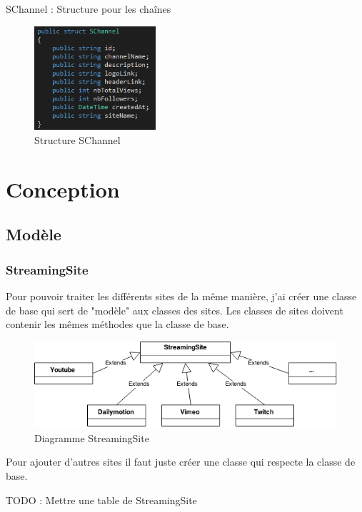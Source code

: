 \documentclass[11pt]{report} %
\begin{document}
			SChannel : Structure pour les chaînes
			
			\begin{figure}[h]
				\center
				\includegraphics[width=0.4\textwidth]{../img/SChannel.png}
				\caption{Structure SChannel}
				\label{SChanel}
			\end{figure}
			
	\newpage
	\section{Conception}
		\subsection{Modèle}
			\subsubsection{StreamingSite}
			Pour pouvoir traiter les différents sites de la même manière, j'ai créer une classe de base qui sert de "modèle" aux classes des sites.
			Les classes de sites doivent contenir les mêmes méthodes que la classe de base.
			
			\begin{figure}[h]
				\center
				\includegraphics[width=1\textwidth]{../img/StreamingSite.png}
				\caption{Diagramme StreamingSite}
				\label{streaming site}
			\end{figure}
			
			Pour ajouter d'autres sites il faut juste créer une classe qui respecte la classe de base.
	
			TODO : Mettre une table de StreamingSite
			
\end{document}
